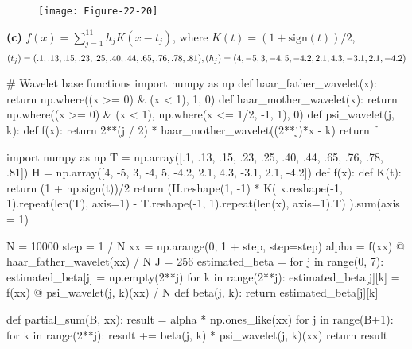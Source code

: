 \begin{figure}[H]
\centering
\texttt{[image: Figure-22-20]}
\end{figure}

\textbf{(c)} \(f(x) = \sum_{j=1}^{11} h_{j} K(x - t_{j})\), where
\(K(t) = (1 + \text{sign}(t)) / 2\),
\[
(t_{j}) = (.1, .13, .15, .23, .25, .40, .44, .65, .76, .78, .81), \\
(h_{j}) = (4, -5, 3, -4, 5, -4.2, 2.1, 4.3, -3.1, 2.1, -4.2)
\]

\begin{python}
# Wavelet base functions
import numpy as np
def haar_father_wavelet(x):
    return np.where((x >= 0) & (x < 1), 1, 0)
def haar_mother_wavelet(x):
    return np.where((x >= 0) & (x < 1), np.where(x <= 1/2, -1, 1), 0)
def psi_wavelet(j, k):
    def f(x):
        return 2**(j / 2) * haar_mother_wavelet((2**j)*x - k)
    return f
\end{python}

\begin{python}
import numpy as np
T = np.array([.1, .13, .15, .23, .25, .40, .44, .65, .76, .78, .81])
H = np.array([4, -5, 3, -4, 5, -4.2, 2.1, 4.3, -3.1, 2.1, -4.2])
def f(x):
    def K(t):
        return (1 + np.sign(t))/2
    return (H.reshape(1, -1) * K(
        x.reshape(-1, 1).repeat(len(T), axis=1) - T.reshape(-1, 1).repeat(len(x), axis=1).T)
    ).sum(axis = 1)
\end{python}

\begin{python}
N = 10000
step = 1 / N
xx = np.arange(0, 1 + step, step=step)
alpha = f(xx) @ haar_father_wavelet(xx) / N
J = 256
estimated_beta = {}
for j in range(0, 7):
    estimated_beta[j] = np.empty(2**j)
    for k in range(2**j):
        estimated_beta[j][k] = f(xx) @ psi_wavelet(j, k)(xx) / N
def beta(j, k):
    return estimated_beta[j][k]
\end{python}

\begin{python}
def partial_sum(B, xx):
    result = alpha * np.ones_like(xx)
    for j in range(B+1):
        for k in range(2**j):
            result += beta(j, k) * psi_wavelet(j, k)(xx)
    return result
\end{python}


